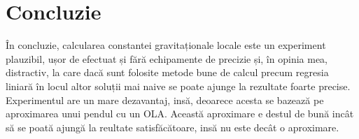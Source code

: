 \documentclass{article}
\begin{document}
\section{Concluzie}
În concluzie, calcularea constantei gravitaționale locale este un experiment plauzibil, ușor de efectuat și fără
echipamente de precizie și, în opinia mea, distractiv, la care dacă sunt folosite metode bune de calcul precum regresia liniară în locul
altor soluții mai naive se poate ajunge la rezultate foarte precise. Experimentul are un mare dezavantaj, insă, 
deoarece acesta se bazează pe aproximarea unui pendul cu un OLA. Această aproximare e destul de bună incât să se
poată ajungă la reultate satisfăcătoare, insă nu este decât o aproximare.
\end{document}
